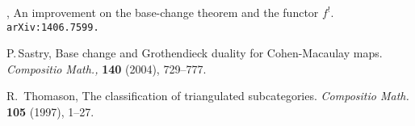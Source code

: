 \documentclass{compositio}
\theoremstyle{plain}
\theoremstyle{definition}
\theoremstyle{remark}
\numberwithin{equation}{thm}
\begin{document}
\begin{thebibliography}{AILN10}
  \bysame, An improvement on the base-change theorem and the functor $f^!$. 
{\tt arXiv:1406.7599.}

 P.\,Sastry,
Base change and Grothendieck duality for Cohen-Macaulay maps. \textit{Compositio Math.,} 
{\bf140} (2004), 729--777.

  R.\ Thomason, 
The classification of triangulated subcategories.
\textit{Compositio Math.} {\bf 105} (1997), 1--27.

\end{thebibliography}
\end{document}
